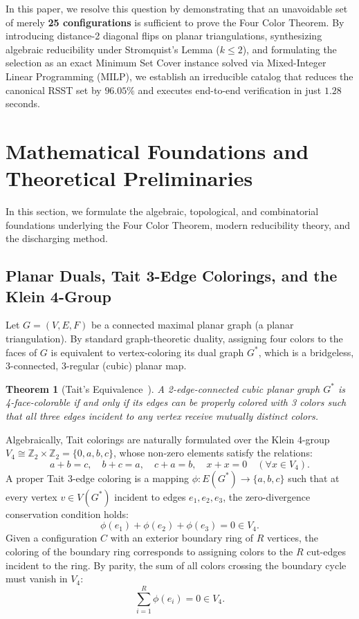 \documentclass[11pt,a4paper]{article}
\theoremstyle{plain}
\newtheorem{theorem}{Theorem}[section]
\theoremstyle{definition}
\begin{document}
In this paper, we resolve this question by demonstrating that an unavoidable set of merely \textbf{25 configurations} is sufficient to prove the Four Color Theorem. By introducing distance-2 diagonal flips on planar triangulations, synthesizing algebraic reducibility under Stromquist's Lemma ($k \le 2$), and formulating the selection as an exact Minimum Set Cover instance solved via Mixed-Integer Linear Programming (MILP), we establish an irreducible catalog that reduces the canonical RSST set by $96.05\%$ and executes end-to-end verification in just $1.28$ seconds.

\section{Mathematical Foundations and Theoretical Preliminaries}

In this section, we formulate the algebraic, topological, and combinatorial foundations underlying the Four Color Theorem, modern reducibility theory, and the discharging method.

\subsection{Planar Duals, Tait 3-Edge Colorings, and the Klein 4-Group}

Let $G = (V, E, F)$ be a connected maximal planar graph (a planar triangulation). By standard graph-theoretic duality, assigning four colors to the faces of $G$ is equivalent to vertex-coloring its dual graph $G^*$, which is a bridgeless, 3-connected, 3-regular (cubic) planar map.

\begin{theorem}[Tait's Equivalence~\cite{tait1880remarks}]
A 2-edge-connected cubic planar graph $G^*$ is 4-face-colorable if and only if its edges can be properly colored with 3 colors such that all three edges incident to any vertex receive mutually distinct colors.
\end{theorem}

Algebraically, Tait colorings are naturally formulated over the Klein 4-group $V_4 \cong \mathbb{Z}_2 \times \mathbb{Z}_2 = \{0, a, b, c\}$, whose non-zero elements satisfy the relations:
\begin{equation}
a + b = c, \quad b + c = a, \quad c + a = b, \quad x + x = 0 \quad (\forall x \in V_4).
\end{equation}
A proper Tait 3-edge coloring is a mapping $\phi: E(G^*) \to \{a, b, c\}$ such that at every vertex $v \in V(G^*)$ incident to edges $e_1, e_2, e_3$, the zero-divergence conservation condition holds:
\begin{equation}
\phi(e_1) + \phi(e_2) + \phi(e_3) = 0 \in V_4.
\label{eq:tait_conservation}
\end{equation}
Given a configuration $C$ with an exterior boundary ring of $R$ vertices, the coloring of the boundary ring corresponds to assigning colors to the $R$ cut-edges incident to the ring. By parity, the sum of all colors crossing the boundary cycle must vanish in $V_4$:
\begin{equation}
\sum_{i=1}^R \phi(e_i) = 0 \in V_4.
\end{equation}
\end{document}
